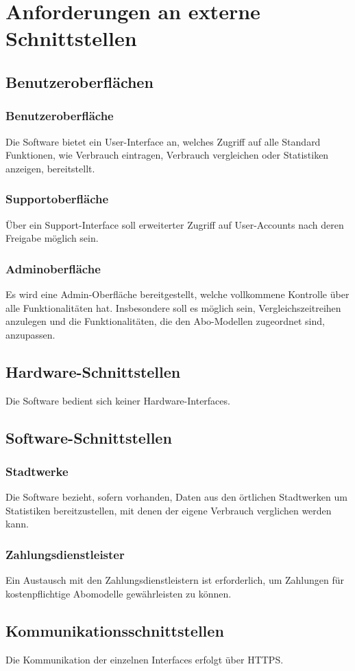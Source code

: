 \section{Anforderungen an externe Schnittstellen}
\subsection{Benutzeroberflächen}
\subsubsection{Benutzeroberfläche}
Die Software bietet ein User-Interface an, welches Zugriff auf alle Standard Funktionen, wie Verbrauch eintragen,
Verbrauch vergleichen oder Statistiken anzeigen, bereitstellt.
\subsubsection{Supportoberfläche}
Über ein Support-Interface soll erweiterter Zugriff auf User-Accounts nach deren Freigabe möglich sein.
\subsubsection{Adminoberfläche}
Es wird eine Admin-Oberfläche bereitgestellt, welche vollkommene Kontrolle über alle Funktionalitäten hat.
Insbesondere soll es möglich sein, Vergleichszeitreihen anzulegen und die Funktionalitäten,
die den Abo-Modellen zugeordnet sind, anzupassen.
\subsection{Hardware-Schnittstellen}
Die Software bedient sich keiner Hardware-Interfaces.
\subsection{Software-Schnittstellen}
\subsubsection{Stadtwerke}
Die Software bezieht, sofern vorhanden, Daten aus den örtlichen Stadtwerken um Statistiken bereitzustellen,
mit denen der eigene Verbrauch verglichen werden kann.
\subsubsection{Zahlungsdienstleister}
Ein Austausch mit den Zahlungsdienstleistern ist erforderlich, um Zahlungen für kostenpflichtige Abomodelle
gewährleisten zu können.
\subsection{Kommunikationsschnittstellen}
Die Kommunikation der einzelnen Interfaces erfolgt über HTTPS.